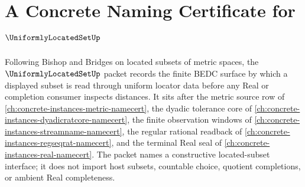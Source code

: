 \chapter{A Concrete Naming Certificate for $\UniformlyLocatedSetUp$}
\label{ch:concrete-instances-uniformly-located-set-namecert}

Following Bishop and Bridges on located subsets of metric spaces, the $\UniformlyLocatedSetUp$ packet records the finite BEDC surface by which a displayed subset is read through uniform locator data before any Real or completion consumer inspects distances. It sits after the metric source row of \autoref{ch:concrete-instances-metric-namecert}, the dyadic tolerance core of \autoref{ch:concrete-instances-dyadicratcore-namecert}, the finite observation windows of \autoref{ch:concrete-instances-streamname-namecert}, the regular rational readback of \autoref{ch:concrete-instances-regseqrat-namecert}, and the terminal Real seal of \autoref{ch:concrete-instances-real-namecert}. The packet names a constructive located-subset interface; it does not import host subsets, countable choice, quotient completions, or ambient Real completeness.

